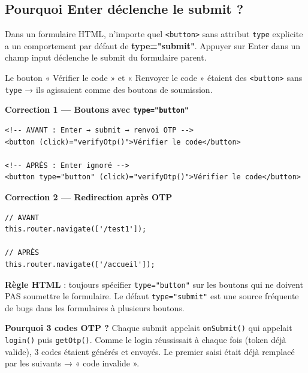 \documentclass[a4paper,12pt,french]{article}
\begin{document}
\subsection{Pourquoi Enter déclenche le submit ?}

Dans un formulaire HTML, n'importe quel \texttt{<button>} sans attribut \texttt{type} explicite a un comportement par défaut de \textbf{type="submit"}. Appuyer sur Enter dans un champ input déclenche le submit du formulaire parent.

Le bouton « Vérifier le code » et « Renvoyer le code » étaient des \texttt{<button>} sans \texttt{type} → ils agissaient comme des boutons de soumission.

\begin{solutionbox}
\textbf{Correction 1 — Boutons avec \texttt{type="button"}}

\begin{lstlisting}[style=htmlstyle]
<!-- AVANT : Enter → submit → renvoi OTP -->
<button (click)="verifyOtp()">Vérifier le code</button>

<!-- APRÈS : Enter ignoré -->
<button type="button" (click)="verifyOtp()">Vérifier le code</button>
\end{lstlisting}

\textbf{Correction 2 — Redirection après OTP}

\begin{lstlisting}[style=tsstyle]
// AVANT
this.router.navigate(['/test1']);

// APRÈS
this.router.navigate(['/accueil']);
\end{lstlisting}
\end{solutionbox}

\begin{lessonbox}
\textbf{Règle HTML} : toujours spécifier \texttt{type="button"} sur les boutons qui ne doivent PAS soumettre le formulaire. Le défaut \texttt{type="submit"} est une source fréquente de bugs dans les formulaires à plusieurs boutons.

\textbf{Pourquoi 3 codes OTP ?} Chaque submit appelait \texttt{onSubmit()} qui appelait \texttt{login()} puis \texttt{getOtp()}. Comme le login réussissait à chaque fois (token déjà valide), 3 codes étaient générés et envoyés. Le premier saisi était déjà remplacé par les suivants → « code invalide ».
\end{lessonbox}

\newpage

\end{document}
